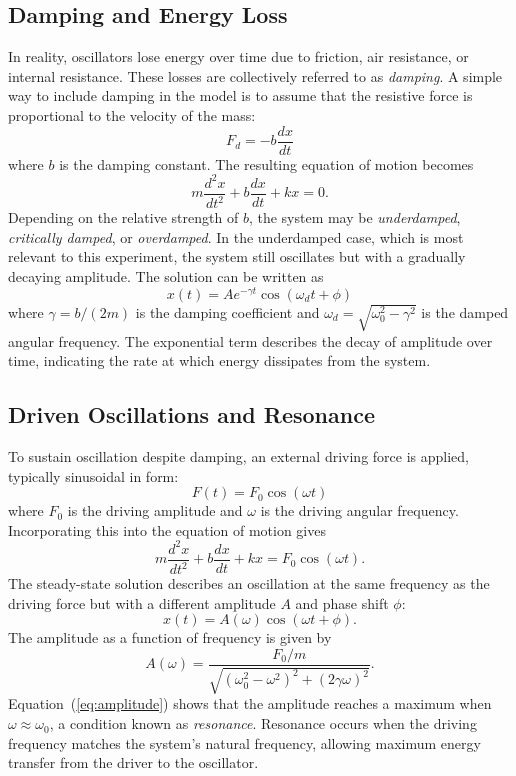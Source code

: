 \documentclass[
	a4paper, %
	10pt, %
	twoside, %
]{journal}
\begin{document}
\subsection{Damping and Energy Loss}
In reality, oscillators lose energy over time due to friction, air resistance, or internal resistance. These losses are collectively referred to as \textit{damping}. A simple way to include damping in the model is to assume that the resistive force is proportional to the velocity of the mass:
\begin{equation}
F_d = -b\frac{dx}{dt}
\end{equation}
where $b$ is the damping constant. The resulting equation of motion becomes
\begin{equation}
m\frac{d^2x}{dt^2} + b\frac{dx}{dt} + kx = 0.
\label{eq:damped}
\end{equation}
Depending on the relative strength of $b$, the system may be \textit{underdamped}, \textit{critically damped}, or \textit{overdamped}. In the underdamped case, which is most relevant to this experiment, the system still oscillates but with a gradually decaying amplitude. The solution can be written as
\begin{equation}
x(t) = A e^{-\gamma t} \cos(\omega_d t + \phi)
\end{equation}
where $\gamma = b/(2m)$ is the damping coefficient and $\omega_d = \sqrt{\omega_0^2 - \gamma^2}$ is the damped angular frequency. The exponential term describes the decay of amplitude over time, indicating the rate at which energy dissipates from the system.  

\subsection{Driven  Oscillations and Resonance}
To sustain oscillation despite damping, an external driving force is applied, typically sinusoidal in form:
\begin{equation}
F(t) = F_0 \cos(\omega t)
\end{equation}
where $F_0$ is the driving amplitude and $\omega$ is the driving angular frequency. Incorporating this into the equation of motion gives
\begin{equation}
m\frac{d^2x}{dt^2} + b\frac{dx}{dt} + kx = F_0 \cos(\omega t).
\label{eq:forced}
\end{equation}
The steady-state solution describes an oscillation at the same frequency as the driving force but with a different amplitude $A$ and phase shift $\phi$:
\begin{equation}
x(t) = A(\omega)\cos(\omega t + \phi).
\end{equation}
The amplitude as a function of frequency is given by
\begin{equation}
A(\omega) = \frac{F_0/m}{\sqrt{(\omega_0^2 - \omega^2)^2 + (2\gamma\omega)^2}}.
\label{eq:amplitude}
\end{equation}
Equation~(\ref{eq:amplitude}) shows that the amplitude reaches a maximum when $\omega \approx \omega_0$, a condition known as \textit{resonance}. Resonance occurs when the driving frequency matches the system’s natural frequency, allowing maximum energy transfer from the driver to the oscillator.  
\end{document}
